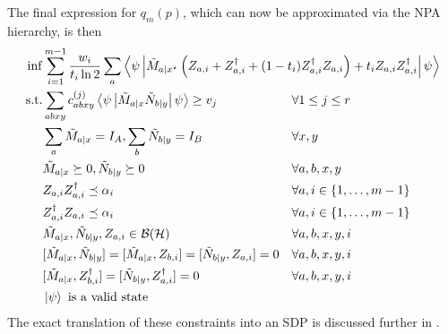 \documentclass[10pt, a4paper]{article}
\numberwithin{equation}{section} %
\theoremstyle{definition}
\theoremstyle{plain}
\newcommand{\dintv}[2]{\mathopen\{#1,\ldots,#2\mathclose\}}
\newcommand{\?}{\mathrel{?}} %
\newcommand{\angleb}[1]{\left\langle #1 \right\rangle} %
\newcommand{\Hs}{\mathcal{H}} %
\newcommand{\sB}{\mathcal{B}}
\begin{document}
        The final expression for \(q_m(p)\), which can now be approximated via the NPA hierarchy, is then
        \begin{equation}
          \begin{aligned}[c]
            \inf & \sum_{i=1}^{m-1} \frac{w_i}{t_i \ln 2} \sum_a \angleb{\psi\left|
            \tilde{M}_{a|x^{\star}} \left( Z_{a,i} + Z_{a,i}^{\dagger} + (1-t_i)  Z_{a,i}^{\dagger}Z_{a,i}\right) + t_i Z_{a,i}Z_{a,i}^{\dagger} \right|\psi} \\
              \text{s.t.} & \begin{aligned}[t] 
          & \sum_{abxy} c^{(j)}_{abxy} \angleb{\psi\left| \tilde{M}_{a|x} \tilde{N}_{b|y} \right|\psi} \geq v_j & & \forall 1 \leq j \leq r \\
          & \sum_{a} \tilde{M}_{a|x} = I_{A}, \sum_{b} \tilde{N}_{b|y} = I_{B} & & \forall x, y \\
          & \tilde{M}_{a|x} \succeq 0, \tilde{N}_{b|y} \succeq 0 & & \forall a, b, x, y \\
          & Z_{a,i} Z_{a,i}^{\dagger} \preceq \alpha_i & & \forall a, i \in \dintv{1}{m-1} \\
          & Z_{a,i}^{\dagger} Z_{a,i} \preceq \alpha_i & & \forall a, i \in \dintv{1}{m-1} \\
          & \tilde{M}_{a|x}, \tilde{N}_{b|y}, Z_{a,i} \in \sB(\Hs) & & \forall a, b, x, y, i \\
          & [\tilde{M}_{a|x}, \tilde{N}_{b|y}] = [\tilde{M}_{a|x}, Z_{b,i}] = [\tilde{N}_{b|y}, Z_{a,i}] = 0 & & \forall a, b, x, y, i \\
          & [\tilde{M}_{a|x}, Z_{b,i}^{\dagger}] = [\tilde{N}_{b|y}, Z_{a,i}^{\dagger}] = 0 & & \forall a, b, x, y, i \\
          & \ket{\psi} \text{ is a valid state} & & \\
              \end{aligned}
              \end{aligned}\label{eqn:bff_npa}
            \end{equation}
            The exact translation of these constraints into an SDP is discussed further in .
\end{document}
